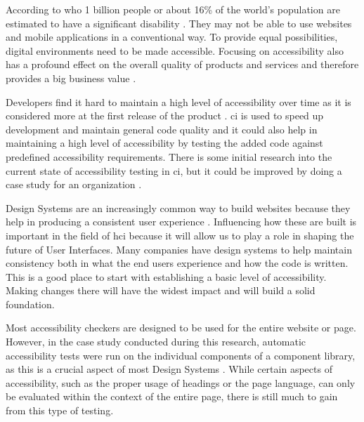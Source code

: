 \documentclass{master_thesis}
\begin{document}

According to \ac{who} 1 billion people or about 16\% of the world's population are estimated to have a significant disability \citep{WHO2022}. They may not be able to use websites and mobile applications in a conventional way. To provide equal possibilities, digital environments need to be made accessible. Focusing on accessibility also has a profound effect on the overall quality of products and services and therefore provides a big business value \citep{Miesenberger2020}.

Developers find it hard to maintain a high level of accessibility over time as it is considered more at the first release of the product \citep{Paterno2020}. \ac{ci} is used to speed up development and maintain general code quality \citep{Zhao2017} and it could also help in maintaining a high level of accessibility by testing the added code against predefined accessibility requirements. There is some initial research into the current state of accessibility testing in \ac{ci}, but it could be improved by doing a case study for an organization \citep{Sane2021, KelseyAdkins2022}.

Design Systems are an increasingly common way to build websites because they help in producing a consistent user experience \citep{Yew2020}. Influencing how these are built is important in the field of \ac{hci} because it will allow us to play a role in shaping the future of User Interfaces. Many companies have design systems to help maintain consistency both in what the end users experience and how the code is written. This is a good place to start with establishing a basic level of accessibility. Making changes there will have the widest impact and will build a solid foundation.

Most accessibility checkers are designed to be used for the entire website or page. However, in the case study conducted during this research, automatic accessibility tests were run on the individual components of a component library, as this is a crucial aspect of most Design Systems \citep{Yew2020}. While certain aspects of accessibility, such as the proper usage of headings or the page language, can only be evaluated within the context of the entire page, there is still much to gain from this type of testing.
\end{document}
